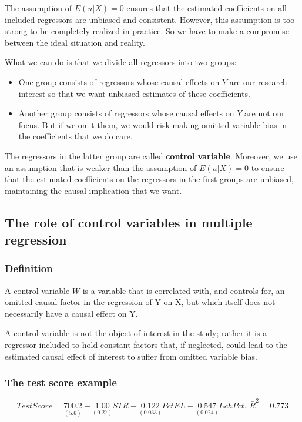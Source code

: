 \documentclass[a4paper,11pt]{article}
\begin{document}
The assumption of \(E(u|X) = 0\) ensures that the estimated coefficients
on all included regressors are unbiased and consistent. However, this
assumption is too strong to be completely realized in practice. So we
have to make a compromise between the ideal situation and reality.

What we can do is that we divide all regressors into two groups:
\begin{itemize}
\item One group consists of regressors whose causal effects on \(Y\) are our
research interest so that we want unbiased estimates of these
coefficients.
\item Another group consists of regressors whose causal effects on \(Y\) are
not our focus. But if we omit them, we would risk making omitted
variable bias in the coefficients that we do care.
\end{itemize}
The regressors in the latter group are called \textbf{control
variable}. Moreover, we use an assumption that is weaker than the
assumption of \(E(u|X)=0\) to ensure that the estimated coefficients on
the regressors in the first groups are unbiased, maintaining the causal
implication that we want.


\subsection{The role of control variables in multiple regression}
\label{sec:org0c4463a}

\subsubsection*{Definition}
\label{sec:org0fc4be8}

A control variable \(W\) is a variable that is correlated with, and
controls for, an omitted causal factor in the regression of Y on X,
but which itself does not necessarily have a causal effect on Y.

A control variable is not the object of interest in the study; rather
it is a regressor included to hold constant factors that, if
neglected, could lead to the estimated causal effect of interest to
suffer from omitted variable bias.

\subsubsection*{The test score example}
\label{sec:org49ae3cb}

\[TestScore = \underset{(5.6)}{700.2} - \underset{(0.27)}{1.00}STR -
\underset{(0.033)}{0.122}PctEL - \underset{(0.024)}{0.547}LchPct,\,
\bar{R}^2 = 0.773 \]
\end{document}

